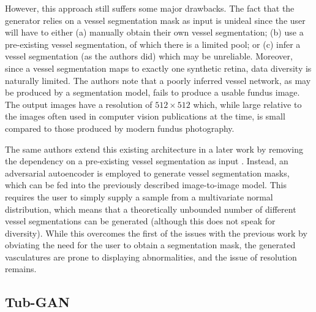 However, this approach still suffers some major drawbacks. 
The fact that the generator relies on a vessel segmentation mask as input is unideal since the user will have to either (a) manually obtain their own vessel segmentation; (b) use a pre-existing vessel segmentation, of which there is a limited pool; or (c) infer a vessel segmentation (as the authors did) which may be unreliable.
Moreover, since a vessel segmentation maps to exactly one synthetic retina, data diversity is naturally limited.
The authors note that a poorly inferred vessel network, as may be produced by a segmentation model, fails to produce a usable fundus image. 
The output images have a resolution of $512 \times 512$ which, while large relative to the images often used in computer vision publications at the time, is small compared to those produced by modern fundus photography.

The same authors extend this existing architecture in a later work by removing the dependency on a pre-existing vessel segmentation as input \cite{Costa2018}.
Instead, an adversarial autoencoder is employed to generate vessel segmentation masks, which can be fed into the previously described image-to-image model.
This requires the user to simply supply a sample from a multivariate normal distribution, which means that a theoretically unbounded number of different vessel segmentations can be generated (although this does not speak for diversity).
While this overcomes the first of the issues with the previous work by obviating the need for the user to obtain a segmentation mask, the generated vasculatures are prone to displaying abnormalities, and the issue of resolution remains.

\subsection{Tub-GAN}

